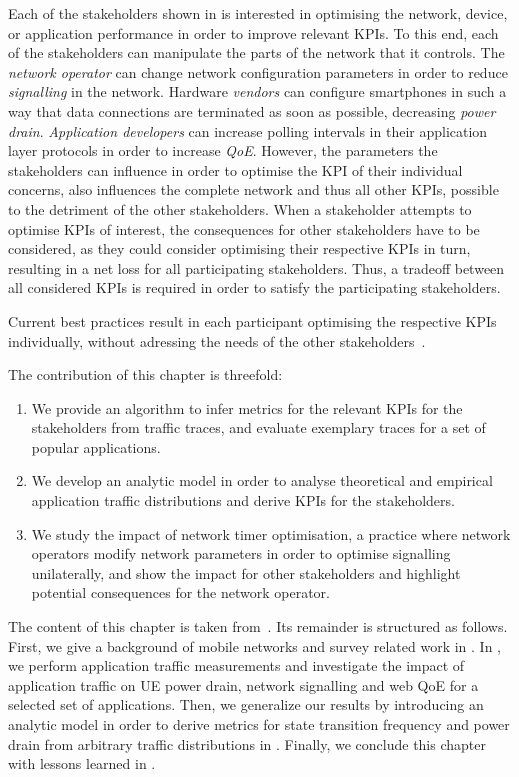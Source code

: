 Each of the stakeholders shown in  is interested in optimising the network, device, or application performance in order to improve relevant \glspl{KPI}.
To this end, each of the stakeholders can manipulate the parts of the network that it controls.
The \emph{network operator} can change network configuration parameters in order to reduce \emph{signalling} in the network.
Hardware \emph{vendors} can configure smartphones in such a way that data connections are terminated as soon as possible, decreasing \emph{power drain}.
\emph{Application developers} can increase polling intervals in their application layer protocols in order to increase \emph{\gls{QoE}}.	
However, the parameters the stakeholders can influence in order to optimise the \gls{KPI} of their individual concerns, also influences the complete network and thus all other \glspl{KPI}, possible to the detriment of the other stakeholders.
When a stakeholder attempts to optimise \glspl{KPI} of interest, the consequences for other stakeholders have to be considered, as they could consider optimising their respective \glspl{KPI} in turn, resulting in a net loss for all participating stakeholders.
Thus, a tradeoff between all considered \glspl{KPI} is required in order to satisfy the participating stakeholders.

Current best practices result in each participant optimising the respective \glspl{KPI} individually, without adressing the needs of the other stakeholders~\cite{Qian2011a,NSN2011}.

The contribution of this chapter is threefold:
\begin{enumerate}
\item We provide an algorithm to infer metrics for the relevant \glspl{KPI} for the stakeholders from traffic traces, and evaluate exemplary traces for a set of popular applications.
\item We develop an analytic model in order to analyse theoretical and empirical application traffic distributions and derive \glspl{KPI} for the stakeholders.
\item We study the impact of network timer optimisation, a practice where network operators modify network parameters in order to optimise signalling unilaterally, and show the impact for other stakeholders and highlight potential consequences for the network operator.
\end{enumerate}

The content of this chapter is taken from~\cite{Schwartz2013a,Schwartz2013c}.
Its remainder is structured as follows.
First, we give a background of mobile networks and survey related work in .
In , we perform application traffic measurements and investigate the impact of application traffic on \gls{UE} power drain, network signalling and web \gls{QoE} for a selected set of applications.
Then, we generalize our results by introducing an analytic model in order to derive metrics for state transition frequency and power drain from arbitrary traffic distributions in .
Finally, we conclude this chapter with lessons learned in .





